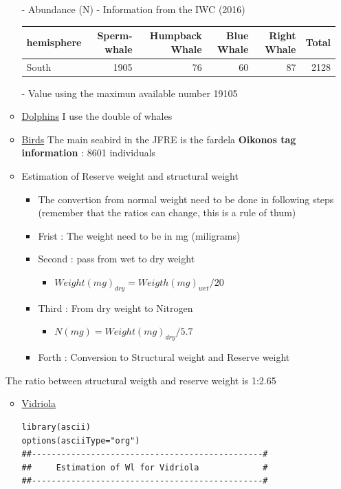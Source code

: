 \documentclass[11pt]{article}
\begin{document}
\begin{itemize}
\begin{itemize}
          - Abundance (N) - Information from the IWC (2016)

\begin{center}
\begin{tabular}{lrrrrr}
 hemisphere  &  Sperm-whale  &  Humpback Whale  &  Blue Whale  &  Right Whale  &  Total  \\
\hline
 South       &         1905  &              76  &          60  &           87  &   2128  \\
\end{tabular}
\end{center}



           - Value using the maximun available number
            19105
\item \underline{Dolphins}
         I use the double of whales
\item \underline{Birds}
         The main seabird in the JFRE is the fardela
          \textbf{Oikonos tag information}   :  8601 individuals
\item Estimation of Reserve weight and structural weight
\begin{itemize}
\item The convertion from normal weight need to be done in following steps (remember that the ratios can change,  this is a rule of thum)
\item Frist  : The weight need to be in mg (miligrams)
\item Second : pass from wet to dry weight
\begin{itemize}
\item \( Weight(mg)_{dry}  = Weigth(mg)_{wet} / 20 \)
\end{itemize}
\item Third  : From dry weight to Nitrogen
\begin{itemize}
\item \(N(mg) = Weight(mg)_{dry} / 5.7\)
\end{itemize}
\item Forth  : Conversion to Structural weight and Reserve weight
\end{itemize}
\end{itemize}
      The ratio between structural weigth and reserve weight is 1:2.65
\begin{itemize}
\item \underline{Vidriola}

\begin{verbatim}
library(ascii)
options(asciiType="org")
##-----------------------------------------------#
##     Estimation of Wl for Vidriola             #
##-----------------------------------------------#


\end{verbatim}
\end{itemize}
\end{itemize}
\end{document}
